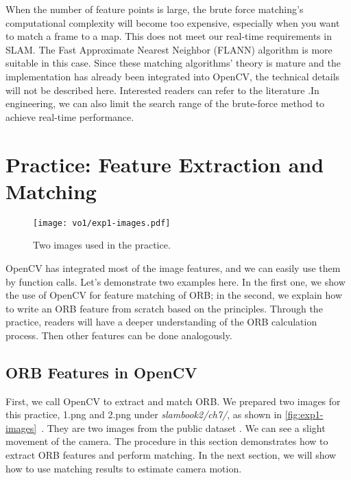When the number of feature points is large, the brute force matching's computational complexity will become too expensive, especially when you want to match a frame to a map. This does not meet our real-time requirements in SLAM. The Fast Approximate Nearest Neighbor (FLANN) algorithm is more suitable in this case. Since these matching algorithms' theory is mature and the implementation has already been integrated into OpenCV, the technical details will not be described here. Interested readers can refer to the literature \cite{Muja2009}.In engineering, we can also limit the search range of the brute-force method to achieve real-time performance.

\section{Practice: Feature Extraction and Matching}
\begin{figure}[!htp]
	\centering
	\texttt{[image: vo1/exp1-images.pdf]}
	\caption{Two images used in the practice.}
	\label{fig:exp1-images}
\end{figure}

OpenCV has integrated most of the image features, and we can easily use them by function calls. Let's demonstrate two examples here. In the first one, we show the use of OpenCV for feature matching of ORB; in the second, we explain how to write an ORB feature from scratch based on the principles. Through the practice, readers will have a deeper understanding of the ORB calculation process. Then other features can be done analogously.

\subsection{ORB Features in OpenCV}
First, we call OpenCV to extract and match ORB. We prepared two images for this practice, 1.png and 2.png under \textit{slambook2/ch7/}, as shown in \autoref{fig:exp1-images}~. They are two images from the public dataset \cite{Sturm2012}. We can see a slight movement of the camera. The procedure in this section demonstrates how to extract ORB features and perform matching. In the next section, we will show how to use matching results to estimate camera motion.

